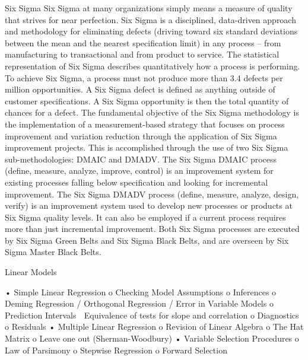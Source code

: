 Six Sigma 
Six Sigma at many organizations simply means a measure of quality that strives for near perfection. Six Sigma is a disciplined,  data-driven approach and methodology for eliminating defects (driving 
toward six standard deviations between the mean and the nearest specification limit) in any process – from manufacturing to transactional and from product to service. The statistical representation of Six Sigma describes quantitatively how a process is performing. To achieve Six Sigma, a process must not produce more than 3.4 defects per million opportunities. A Six Sigma defect is defined as anything outside of customer specifications. A Six Sigma opportunity is then the total quantity of chances for a defect. The fundamental objective of the Six Sigma methodology is the implementation of a measurement-based strategy that focuses on process improvement and variation reduction through the application of Six Sigma improvement projects. 
This is accomplished through the use of two Six Sigma sub-methodologies: DMAIC and DMADV.  The Six Sigma DMAIC process (define, measure, analyze, improve, control) is an improvement system for existing processes falling below specification and looking for incremental improvement. 
The Six Sigma DMADV process (define, measure, analyze, design, verify) is an improvement system used to develop new processes or products at Six Sigma quality levels. It can also be employed if a current process requires more than just incremental improvement.
Both Six Sigma processes are executed by Six Sigma Green Belts and Six Sigma Black Belts, and are overseen by Six Sigma Master Black Belts.


Linear Models

•	Simple Linear Regression 
o	Checking Model Assumptions
o	Inferences
o	Deming Regression / Orthogonal Regression / Error in Variable Models
o	Prediction Intervals
	Equivalence of tests for slope and correlation 
o	Diagnostics
o	Residuals
•	Multiple Linear Regression
o	Revision of Linear Algebra
o	The Hat Matrix
o	Leave one out (Sherman-Woodbury)
•	Variable Selection Procedures
o	Law of Parsimony
o	Stepwise Regression
o	Forward Selection
